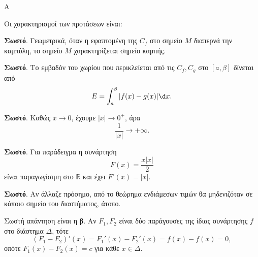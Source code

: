 \begin{thema}{Α}
\begin{erwthma}
\item {}

\item {}

\item {}

\item Οι χαρακτηρισμοί των προτάσεων είναι:
\begin{alist}
\item \textbf{Σωστό}. Γεωμετρικά, όταν η εφαπτομένη της $C_f$ στο σημείο $M$ διαπερνά την καμπύλη, το σημείο $M$ χαρακτηρίζεται σημείο καμπής.
\item \textbf{Σωστό}. Το εμβαδόν του χωρίου που περικλείεται από τις $C_f,C_g$ στο $[a,\beta]$ δίνεται από
\[ E=\dint_a^\beta |f(x)-g(x)|\d x. \]
\item \textbf{Σωστό}. Καθώς $x\to0$, έχουμε $|x|\to0^+$, άρα
\[ \dfrac{1}{|x|}\to+\infty. \]
\item \textbf{Σωστό}. Για παράδειγμα η συνάρτηση
\[ F(x)=\dfrac{x|x|}{2} \]
είναι παραγωγίσιμη στο $\mathbb{R}$ και έχει $F'(x)=|x|$.
\item \textbf{Σωστό}. Αν άλλαζε πρόσημο, από το θεώρημα ενδιάμεσων τιμών θα μηδενιζόταν σε κάποιο σημείο του διαστήματος, άτοπο.
\end{alist}

\item Σωστή απάντηση είναι η \textbf{β}. Αν $F_1,F_2$ είναι δύο παράγουσες της ίδιας συνάρτησης $f$ στο διάστημα $\Delta$, τότε
\[ (F_1-F_2)'(x)=F_1'(x)-F_2'(x)=f(x)-f(x)=0, \]
οπότε $F_1(x)-F_2(x)=c$ για κάθε $x\in\Delta$.
\end{erwthma}
\end{thema}

